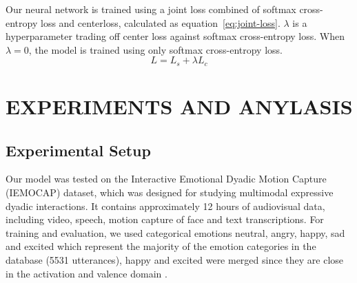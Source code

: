 \documentclass{article}
\begin{document}
Our neural network is trained using a joint loss combined of softmax cross-entropy loss and centerloss, calculated as equation~\ref{eq:joint-loss}. $\lambda$ is a hyperparameter trading off center loss against softmax cross-entropy loss. When  $\lambda=0$, the model is trained using only softmax cross-entropy loss.
\begin{equation} \label{eq:joint-loss}
L=L_s+ \lambda L_c
\end{equation}
%
%
%


\section{EXPERIMENTS AND ANYLASIS}

\subsection{Experimental Setup}
Our model was tested on the Interactive Emotional Dyadic Motion Capture (IEMOCAP) \cite{busso2008iemocap} dataset, which was designed for studying multimodal expressive dyadic interactions. It contains approximately 12 hours of audiovisual data, including video, speech, motion capture of face and text transcriptions. For training and evaluation, we used categorical emotions neutral, angry, happy, sad and excited which represent the majority of the emotion categories in the database (5531 utterances), happy and excited were merged since they are close in the activation and valence domain \cite{busso2008iemocap}.
\end{document}
